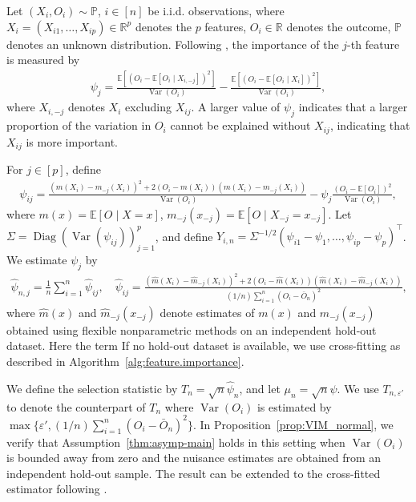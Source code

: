 \documentclass[12pt]{article}
\newcommand{\Var}{\operatorname{Var}}
\newcommand{\Pp}{{\mathbb{P}}}
\newcommand{\Ee}{{\mathbb{E}}}
\begin{document}
Let $(X_i, O_i) \sim \Pp$, $i \in [n]$ be i.i.d. observations, where \(X_i = (X_{i1}, \ldots, X_{ip}) \in \mathbb{R}^p\) denotes the $p$ features, \(O_i \in \mathbb{R}\) denotes the outcome,  \(\Pp\) denotes an unknown distribution.
Following \citet{williamson2023general}, the importance of the $j$-th feature is measured by
\begin{align*}
    \psi_j
    = \frac{\mathbb{E}\left[\left(O_{i} - \mathbb{E}[O_i \mid X_{i,-j}]\right)^2\right]}{\Var(O_i)} - \frac{\mathbb{E}\left[\left(O_i - \mathbb{E}[O_i \mid X_i]\right)^2\right]}{\Var(O_i)},
\end{align*}
where $X_{i,-j}$ denotes $X_i$ excluding $X_{ij}$.
A larger value of $\psi_j$ indicates that a larger proportion of the variation in $O_i$ cannot be explained without $X_{ij}$, indicating that $X_{ij}$ is more important.

For $j\in[p]$, define
\begin{align*}
\psi_{ij}
= \frac{
\left({m}(X_i)-{m}_{-j}(X_{i})\right)^2
+
2(O_i-{m}(X_i))({m}(X_i)-{m}_{-j}(X_{i}))
}{\Var(O_i)
} - \psi_j\frac{(O_i-\Ee[O_i])^2}{\Var(O_i)},
\end{align*}
where $m(x)=\mathbb{E}[O \mid X=x]$,
$m_{-j}(x_{-j})=\mathbb{E}[O \mid X_{-j}=x_{-j}]$.
Let $\Sigma
=\operatorname{Diag}(\Var(\psi_{ij}))_{j=1}^p$, and define
$Y_{i,n} = \Sigma^{-1/2} (\psi_{i1} - \psi_1, \ldots, \psi_{ip} - \psi_p)^\top$.
We estimate $\psi_j$ by
\begin{align*}
\widehat{\psi}_{n,j}
=
\frac{1}{n}\sum_{i=1}^n \widehat{\psi}_{ij},\quad
\widehat{\psi}_{ij} =
\frac{
\left(\widehat{m}(X_i)-\widehat{m}_{-j}(X_{i})\right)^2
+
2(O_i-\widehat{m}(X_i))(\widehat{m}(X_i)-\widehat{m}_{-j}(X_{i}))
}{
(1/n)\sum_{i=1}^n (O_i-\bar{O}_n)^2
},
\end{align*}
where $\widehat{m}(x)$ and $\widehat{m}_{-j}(x_{-j})$ denote estimates of $m(x)$ and $m_{-j}(x_{-j})$ obtained using flexible nonparametric methods on an independent hold-out dataset. 
Here the term
If no hold-out dataset is available, we use cross-fitting as described in Algorithm~\ref{alg:feature.importance}.


We define the selection statistic by
$T_n = \sqrt{n}\widehat{\psi}_n$, and let
$\mu_n = \sqrt{n} \psi$.
We use $T_{n,\varepsilon'}$ to denote the counterpart of $T_n$ where $\Var(O_i)$ is estimated by $\max\{\varepsilon', (1/n)\sum_{i=1}^n (O_i-\bar{O}_n)^2\}$.
In Proposition~\ref{prop:VIM_normal}, we verify that Assumption~\ref{thm:asymp-main} holds in this setting when $\Var(O_i)$ is bounded away from zero and the nuisance estimates are obtained from an independent hold-out sample. 
The result can be extended to the cross-fitted estimator following \cite{chernozhukov2018double}.
\end{document}
